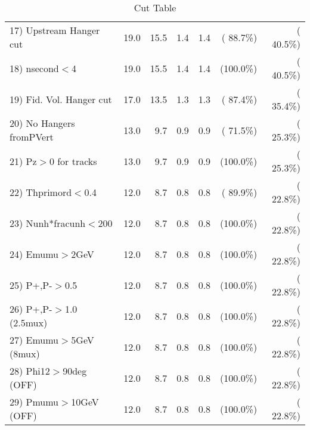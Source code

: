 \begin{table}[h!]
\begin{tabular}{||l||r|r|r|r|r|r||}
 17) Upstream Hanger cut  &         19.0 &         15.5 &          1.4 &          1.4 & ( 88.7\%) & ( 40.5\%) \\
 18) nsecond$<$4          &         19.0 &         15.5 &          1.4 &          1.4 & (100.0\%) & ( 40.5\%) \\
 19) Fid. Vol. Hanger cut &         17.0 &         13.5 &          1.3 &          1.3 & ( 87.4\%) & ( 35.4\%) \\
 20) No Hangers fromPVert &         13.0 &          9.7 &          0.9 &          0.9 & ( 71.5\%) & ( 25.3\%) \\
 21) Pz$>$0 for tracks    &         13.0 &          9.7 &          0.9 &          0.9 & (100.0\%) & ( 25.3\%) \\
 22) Thprimord$<$0.4      &         12.0 &          8.7 &          0.8 &          0.8 & ( 89.9\%) & ( 22.8\%) \\
 23) Nunh*fracunh$<$200   &         12.0 &          8.7 &          0.8 &          0.8 & (100.0\%) & ( 22.8\%) \\
 24) Emumu$>$2GeV         &         12.0 &          8.7 &          0.8 &          0.8 & (100.0\%) & ( 22.8\%) \\
 25) P+,P-$>$0.5          &         12.0 &          8.7 &          0.8 &          0.8 & (100.0\%) & ( 22.8\%) \\
 26) P+,P-$>$1.0 (2.5mux) &         12.0 &          8.7 &          0.8 &          0.8 & (100.0\%) & ( 22.8\%) \\
 27) Emumu$>$5GeV  (8mux) &         12.0 &          8.7 &          0.8 &          0.8 & (100.0\%) & ( 22.8\%) \\
 28) Phi12$>$90deg  (OFF) &         12.0 &          8.7 &          0.8 &          0.8 & (100.0\%) & ( 22.8\%) \\
 29) Pmumu$>$10GeV  (OFF) &         12.0 &          8.7 &          0.8 &          0.8 & (100.0\%) & ( 22.8\%) \\
 \hline
 \hline
 \end{tabular}
 \caption{Cut Table           }
 \label{tab-cutcohjpsi-mumu_anumucc}
 \end{table}
